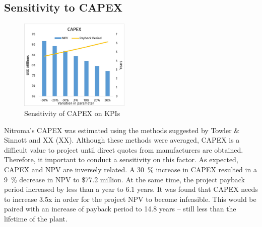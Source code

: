 \subsection{Sensitivity to CAPEX}
\begin{figure}
    \caption{Sensitivity of CAPEX on KPIs}
    \label{Sensitivity_CAPEX}
    \includegraphics[width=0.47\textwidth]{chapters/6-economics/figures/Sensitivity_CAPEX.jpg}
\end{figure}
Nitroma’s CAPEX was estimated using the methods suggested by Towler \& Sinnott and XX (XX). Although these methods were averaged, CAPEX is a difficult value to project until direct quotes from manufacturers are obtained. Therefore, it important to conduct a sensitivity on this factor. As expected, CAPEX and NPV are inversely related. A \SI{30}{\percent} increase in CAPEX resulted in a \SI{9}{\percent} decrease in NPV to \$77.2 million. At the same time, the project payback period increased by less than a year to 6.1 years. It was found that CAPEX needs to increase 3.5x in order for the project NPV to become infeasible. This would be paired with an increase of payback period to 14.8 years – still less than the lifetime of the plant.

